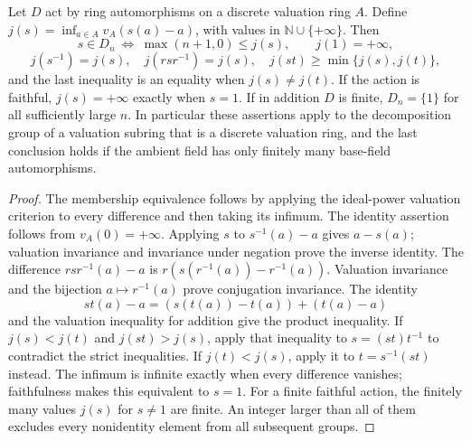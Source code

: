 \begin{lemma}
\label{fw:integral-order-function}
\leanok
Let $D$ act by ring automorphisms on a discrete valuation ring $A$.
Define $j(s)=\inf_{a\in A}v_A(s(a)-a)$, with values in
$\mathbb N\cup\{+\infty\}$. Then
\[
 s\in D_n\ \Longleftrightarrow\ \max(n+1,0)\leq j(s),\qquad
 j(1)=+\infty,
\]
\[
 j(s^{-1})=j(s),\quad j(rsr^{-1})=j(s),\quad
 j(st)\geq\min\{j(s),j(t)\},
\]
and the last inequality is an equality when $j(s)\ne j(t)$.
If the action is faithful, $j(s)=+\infty$ exactly when $s=1$.
If in addition $D$ is finite, $D_n=\{1\}$ for all sufficiently large $n$.
In particular these assertions apply to the decomposition group of a
valuation subring that is a discrete valuation ring, and the last
conclusion holds if the ambient field has only finitely many base-field
automorphisms.
\end{lemma}
\begin{proof}
The membership equivalence follows by applying the ideal-power valuation
criterion to every difference and then taking its infimum.
The identity assertion follows from $v_A(0)=+\infty$.
Applying $s$ to $s^{-1}(a)-a$ gives $a-s(a)$; valuation invariance
and invariance under negation prove the inverse identity.
The difference $rsr^{-1}(a)-a$ is
$r(s(r^{-1}(a))-r^{-1}(a))$. Valuation invariance and the bijection
$a\mapsto r^{-1}(a)$ prove conjugation invariance.
The identity
\[
 st(a)-a=(s(t(a))-t(a))+(t(a)-a)
\]
and the valuation inequality for addition give the product inequality.
If $j(s)<j(t)$ and $j(st)>j(s)$, apply that inequality to
$s=(st)t^{-1}$ to contradict the strict inequalities.
If $j(t)<j(s)$, apply it to $t=s^{-1}(st)$ instead.
The infimum is infinite exactly when every difference vanishes;
faithfulness makes this equivalent to $s=1$.
For a finite faithful action, the finitely many values $j(s)$ for
$s\ne1$ are finite. An integer larger than all of them excludes every
nonidentity element from all subsequent groups.
\end{proof}

